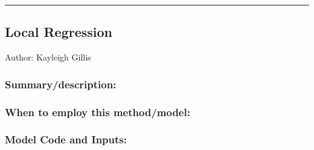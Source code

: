 \documentclass[
]{article}
\newenvironment{Shaded}{\begin{snugshade}}{\end{snugshade}}
\newcommand{\AttributeTok}[1]{\textcolor[rgb]{0.77,0.63,0.00}{#1}}
\newcommand{\ConstantTok}[1]{\textcolor[rgb]{0.00,0.00,0.00}{#1}}
\newcommand{\DecValTok}[1]{\textcolor[rgb]{0.00,0.00,0.81}{#1}}
\newcommand{\FunctionTok}[1]{\textcolor[rgb]{0.00,0.00,0.00}{#1}}
\newcommand{\NormalTok}[1]{#1}
\newcommand{\OtherTok}[1]{\textcolor[rgb]{0.56,0.35,0.01}{#1}}
\newcommand{\SpecialCharTok}[1]{\textcolor[rgb]{0.00,0.00,0.00}{#1}}
\newcommand{\StringTok}[1]{\textcolor[rgb]{0.31,0.60,0.02}{#1}}
\begin{document}
\begin{Shaded}
\end{Shaded}

\begin{center}\rule{0.5\linewidth}{0.5pt}\end{center}

\hypertarget{local-regression}{%
\subsection{Local Regression}\label{local-regression}}

Author: Kayleigh Gillis

\hypertarget{summarydescription-8}{%
\subsubsection{Summary/description:}\label{summarydescription-8}}

\hypertarget{when-to-employ-this-methodmodel-8}{%
\subsubsection{When to employ this
method/model:}\label{when-to-employ-this-methodmodel-8}}

\hypertarget{model-code-and-inputs-8}{%
\subsubsection{Model Code and Inputs:}\label{model-code-and-inputs-8}}
\end{document}
